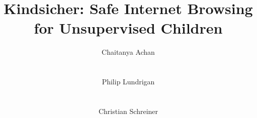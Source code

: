 \documentclass{sigchi}
\begin{document}
\title{Kindsicher: Safe Internet Browsing for Unsupervised Children}

\author{
  \alignauthor Chaitanya Achan\\
    \\
    \\
  \alignauthor Philip Lundrigan\\
    \\
    \\
  \alignauthor Christian Schreiner\\
    \\
    \\
}

\maketitle



\begin{abstract}

\end{abstract}










\balance




\end{document}
